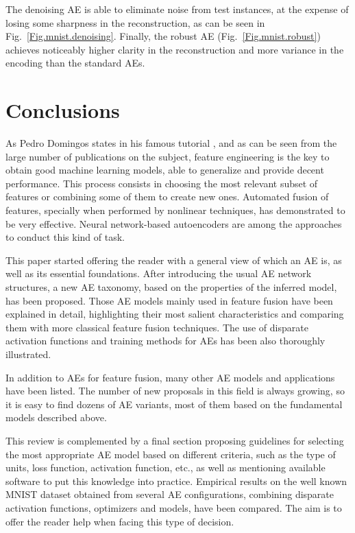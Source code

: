 The denoising AE is able to eliminate noise from test instances, at the expense of losing some sharpness in the reconstruction, as can be seen in Fig.~\ref{Fig.mnist.denoising}. Finally, the robust AE (Fig.~\ref{Fig.mnist.robust}) achieves noticeably higher clarity in the reconstruction and more variance in the encoding than the standard AEs.


\section{Conclusions}\label{Conclusions}
As Pedro Domingos states in his famous tutorial \cite{Domingos2012AFU}, and as can be seen from the large number of publications on the subject, feature engineering is the key to obtain good machine learning models, able to generalize and provide decent performance. This process consists in choosing the most relevant subset of features or combining some of them to create new ones. Automated fusion of features, specially when performed by nonlinear techniques, has demonstrated to be very effective. Neural network-based autoencoders are among the approaches to conduct this kind of task.

This paper started offering the reader with a general view of which an AE is, as well as its essential foundations. After introducing the usual AE network structures, a new AE taxonomy, based on the properties of the inferred model, has been proposed. Those AE models mainly used in feature fusion have been explained in detail, highlighting their most salient characteristics and comparing them with more classical feature fusion techniques. The use of disparate activation functions and training methods for AEs has been also thoroughly illustrated. 

In addition to AEs for feature fusion, many other AE models and applications have been listed. The number of new proposals in this field is always growing, so it is easy to find dozens of AE variants, most of them based on the fundamental models described above.

This review is complemented by a final section proposing guidelines for selecting the most appropriate AE model based on different criteria, such as the type of units, loss function, activation function, etc., as well as mentioning available software to put this knowledge into practice. Empirical results on the well known MNIST dataset obtained from several AE configurations, combining disparate activation functions, optimizers and models, have been compared. The aim is to offer the reader help when facing this type of decision.

